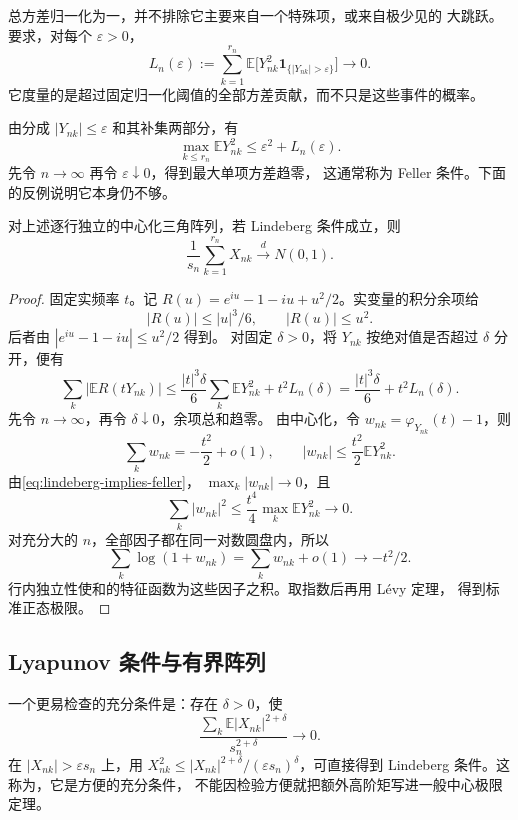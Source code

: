 总方差归一化为一，并不排除它主要来自一个特殊项，或来自极少见的
大跳跃。要求，对每个 $\varepsilon>0$，
\begin{equation}
\label{eq:lindeberg-condition}
 L_n(\varepsilon):=\sum_{k=1}^{r_n}
 \mathbb E\bigl[Y_{nk}^2\mathbf1_{\{|Y_{nk}|>\varepsilon\}}\bigr]
 \longrightarrow0.
\end{equation}
它度量的是超过固定归一化阈值的全部方差贡献，而不只是这些事件的概率。

由分成 $|Y_{nk}|\le\varepsilon$ 和其补集两部分，有
\begin{equation}
\label{eq:lindeberg-implies-feller}
 \max_{k\le r_n}\mathbb E Y_{nk}^2
 \le\varepsilon^2+L_n(\varepsilon).
\end{equation}
先令 $n\to\infty$ 再令 $\varepsilon\downarrow0$，得到最大单项方差趋零，
这通常称为 Feller 条件。下面的反例说明它本身仍不够。

\begin{theorem}
\label{thm:lindeberg-central-limit}
对上述逐行独立的中心化三角阵列，若 Lindeberg 条件成立，则
\[
 \frac1{s_n}\sum_{k=1}^{r_n}X_{nk}\xrightarrow dN(0,1).
\]
\end{theorem}

\begin{proof}
固定实频率 $t$。记
$R(u)=e^{iu}-1-iu+u^2/2$。实变量的积分余项给
\[
 |R(u)|\le |u|^3/6,\qquad |R(u)|\le u^2.
\]
后者由 $|e^{iu}-1-iu|\le u^2/2$ 得到。
对固定 $\delta>0$，将 $Y_{nk}$ 按绝对值是否超过 $\delta$ 分开，便有
\[
 \sum_k|\mathbb ER(tY_{nk})|
 \le\frac{|t|^3\delta}6\sum_k\mathbb E Y_{nk}^2
       +t^2L_n(\delta)
 =\frac{|t|^3\delta}6+t^2L_n(\delta).
\]
先令 $n\to\infty$，再令 $\delta\downarrow0$，余项总和趋零。
由中心化，令 $w_{nk}=\varphi_{Y_{nk}}(t)-1$，则
\[
 \sum_kw_{nk}=-\frac{t^2}2+o(1),\qquad
 |w_{nk}|\le\frac{t^2}2\mathbb E Y_{nk}^2.
\]
由\eqref{eq:lindeberg-implies-feller}，
$\max_k|w_{nk}|\to0$，且
\[
 \sum_k|w_{nk}|^2
 \le\frac{t^4}4\max_k\mathbb E Y_{nk}^2\longrightarrow0.
\]
对充分大的 $n$，全部因子都在同一对数圆盘内，所以
\[
 \sum_k\log(1+w_{nk})=\sum_kw_{nk}+o(1)\longrightarrow-t^2/2.
\]
行内独立性使和的特征函数为这些因子之积。取指数后再用 Lévy 定理，
得到标准正态极限。
\end{proof}

\subsection{Lyapunov 条件与有界阵列}

一个更易检查的充分条件是：存在 $\delta>0$，使
\[
 \frac{\sum_k\mathbb E|X_{nk}|^{2+\delta}}{s_n^{2+\delta}}
 \longrightarrow0.
\]
在 $|X_{nk}|>\varepsilon s_n$ 上，用
$X_{nk}^2\le |X_{nk}|^{2+\delta}/(\varepsilon s_n)^\delta$，可直接得到
Lindeberg 条件。这称为，它是方便的充分条件，
不能因检验方便就把额外高阶矩写进一般中心极限定理。

